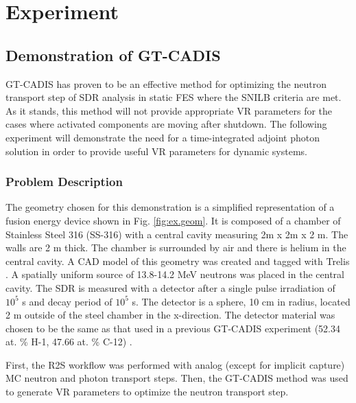 \graphicspath{{/home/chelsea/prelim/src/figs}}

\chapter{Experiment} \label{ch:exp}

\section{Demonstration of GT-CADIS} \label{sec:gtcadis}
GT-CADIS has proven to be an effective method 
for optimizing the neutron transport step of 
SDR analysis in static FES where the SNILB criteria are met.  As it stands, this method
will not provide appropriate VR parameters for the cases where activated
components are moving
after shutdown.  The following experiment will demonstrate the need for a
time-integrated adjoint photon solution in order to provide useful VR parameters for
dynamic systems.

\subsection{Problem Description} \label{sec:description}
The geometry chosen for this demonstration is a simplified representation of a 
fusion energy device shown in Fig. \ref{fig:ex.geom}.
It is composed of a chamber of Stainless Steel 316 (SS-316) with a central cavity measuring
2m x 2m x 2 m.  The walls are 2 m thick.  The chamber is surrounded by air and
there is helium in the central cavity.  A CAD model of this geometry was created and tagged
with Trelis \cite{trelis}.  A spatially uniform source of
13.8-14.2 MeV neutrons was placed in the central cavity. 
The SDR is measured with a detector after a single pulse irradiation of $10^5$ s and
decay period of $10^5$ s.  The detector is a sphere, 10 cm in radius, located
2 m outside of the steel chamber in the x-direction. The detector material was chosen to
be the same as that used in a previous GT-CADIS experiment (52.34 at. \% H-1,
47.66 at. \% C-12) \cite{gtcadis}.  

First, the R2S workflow was performed with analog (except for implicit capture)
MC neutron and photon transport steps.
Then, the GT-CADIS method was used to generate VR parameters
to optimize the neutron transport step.

